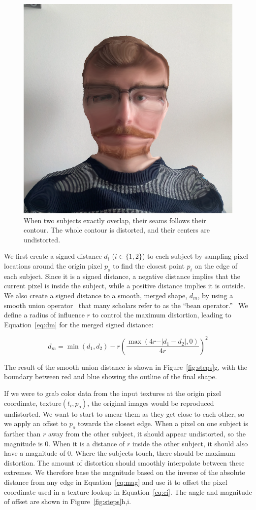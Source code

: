 \documentclass[twocolumn]{article}
\begin{document}
\begin{figure}
    \centering
    \includegraphics[width=0.65\linewidth]{img/overlap.png}
    \caption{When two subjects exactly overlap, their seams follows their contour. The whole contour is distorted, and their centers are undistorted.}
    \label{fig:overlap}
\end{figure}

We first create a signed distance $d_i$ ($i \in \{1,2\}$) to each subject by sampling pixel locations around the origin pixel $p_o$ to find the closest point $p_i$ on the edge of each subject. Since it is a signed distance, a negative distance implies that the current pixel is inside the subject, while a positive distance implies it is outside. We also create a signed distance to a smooth, merged shape, $d_m$, by using a smooth union operator~\cite{quilez-smin} that many scholars refer to as the ``bean operator.''~\cite{bean} We define a radius of influence $r$ to control the maximum distortion, leading to Equation~\ref{eq:dm} for the merged signed distance:

\begin{equation}
    \label{eq:dm}
    d_m = \min(d_1, d_2) - r\left(\frac{\max(4r-\vert d_1-d_2\vert, 0)}{4r}\right)^2
\end{equation}

The result of the smooth union distance is shown in Figure~\ref{fig:steps}g, with the boundary between red and blue showing the outline of the final shape.

If we were to grab color data from the input textures at the origin pixel coordinate, $\text{texture}(t_i, p_o)$, the original images would be reproduced undistorted. We want to start to smear them as they get close to each other, so we apply an offset to $p_o$ towards the closest edge. When a pixel on one subject is farther than $r$ away from the other subject, it should appear undistorted, so the magnitude is 0. When it is a distance of $r$ inside the other subject, it should also have a magnitude of 0. Where the subjects touch, there should be maximum distortion. The amount of distortion should smoothly interpolate between these extremes. We therefore base the magnitude based on the inverse of the absolute distance from any edge in Equation~\ref{eq:mag} and use it to offset the pixel coordinate used in a texture lookup in Equation~\ref{eq:ci}. The angle and magnitude of offset are shown in Figure~\ref{fig:steps}h,i.
\end{document}
